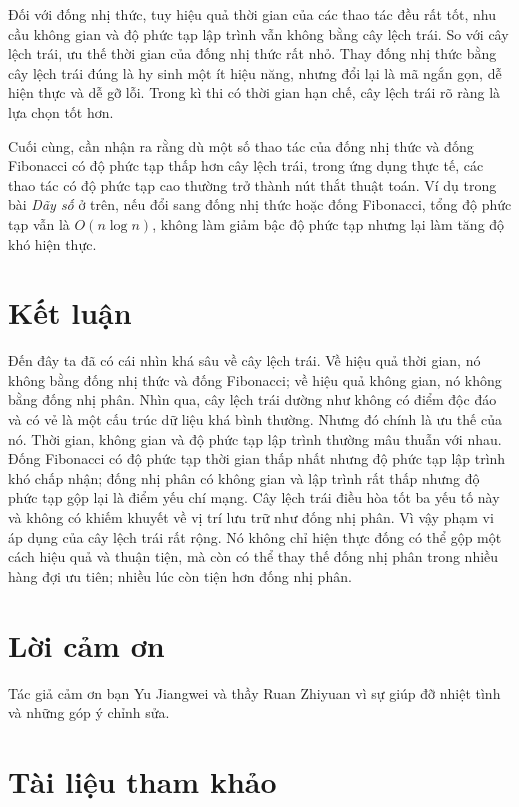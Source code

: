 \documentclass[11pt]{article}
\begin{document}
Đối với đống nhị thức, tuy hiệu quả thời gian của các thao tác đều rất tốt,
nhu cầu không gian và độ phức tạp lập trình vẫn không bằng cây lệch trái. So
với cây lệch trái, ưu thế thời gian của đống nhị thức rất nhỏ. Thay đống nhị
thức bằng cây lệch trái đúng là hy sinh một ít hiệu năng, nhưng đổi lại là mã
ngắn gọn, dễ hiện thực và dễ gỡ lỗi. Trong kì thi có thời gian hạn chế, cây
lệch trái rõ ràng là lựa chọn tốt hơn.

Cuối cùng, cần nhận ra rằng dù một số thao tác của đống nhị thức và đống
Fibonacci có độ phức tạp thấp hơn cây lệch trái, trong ứng dụng thực tế, các
thao tác có độ phức tạp cao thường trở thành nút thắt thuật toán. Ví dụ trong
bài \emph{Dãy số} ở trên, nếu đổi sang đống nhị thức hoặc đống Fibonacci, tổng
độ phức tạp vẫn là \(O(n\log n)\), không làm giảm bậc độ phức tạp nhưng lại làm
tăng độ khó hiện thực.

\section{Kết luận}

Đến đây ta đã có cái nhìn khá sâu về cây lệch trái. Về hiệu quả thời gian, nó
không bằng đống nhị thức và đống Fibonacci; về hiệu quả không gian, nó không
bằng đống nhị phân. Nhìn qua, cây lệch trái dường như không có điểm độc đáo và
có vẻ là một cấu trúc dữ liệu khá bình thường. Nhưng đó chính là ưu thế của nó.
Thời gian, không gian và độ phức tạp lập trình thường mâu thuẫn với nhau. Đống
Fibonacci có độ phức tạp thời gian thấp nhất nhưng độ phức tạp lập trình khó
chấp nhận; đống nhị phân có không gian và lập trình rất thấp nhưng độ phức tạp
gộp lại là điểm yếu chí mạng. Cây lệch trái điều hòa tốt ba yếu tố này và không
có khiếm khuyết về vị trí lưu trữ như đống nhị phân. Vì vậy phạm vi áp dụng của
cây lệch trái rất rộng. Nó không chỉ hiện thực đống có thể gộp một cách hiệu quả
và thuận tiện, mà còn có thể thay thế đống nhị phân trong nhiều hàng đợi ưu
tiên; nhiều lúc còn tiện hơn đống nhị phân.

\section*{Lời cảm ơn}

Tác giả cảm ơn bạn Yu Jiangwei và thầy Ruan Zhiyuan vì sự giúp đỡ nhiệt tình và
những góp ý chỉnh sửa.

\section*{Tài liệu tham khảo}
\end{document}
